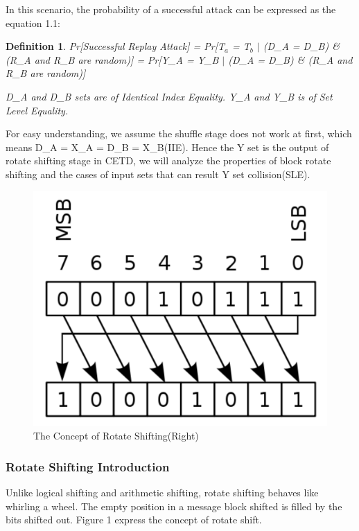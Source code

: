 \documentclass{article}
\newtheorem{defination}{Definition}[section]
\begin{document}
In this scenario, the probability of a successful attack can be expressed as the equation 1.1:
\begin{defination}
Pr[Successful Replay Attack] = Pr[T$_a$ = T$_b$ $\mid$ (D\_A = D\_B) \& (R\_A and R\_B are random)]
							 = Pr[Y\_A = Y\_B $\mid$ (D\_A = D\_B) \& (R\_A and R\_B are random)]
							 
D\_A and D\_B sets are of Identical Index Equality. Y\_A and Y\_B is of Set Level Equality.
\end{defination} 
For easy understanding, we assume the shuffle stage does not work at first, which means D\_A = X\_A = D\_B = X\_B(IIE). Hence the Y set is the output of rotate shifting stage in CETD, we will analyze the properties of block rotate shifting and the cases of input sets that can result Y set collision(SLE). 

\begin{figure}[htbp]
 \centering
 \includegraphics[scale=0.4]{./diagrams/rotate_right.pdf}
 \caption{The Concept of Rotate Shifting(Right)}
 \label{fig:1 }
\end{figure}

\subsubsection{Rotate Shifting Introduction} 
Unlike logical shifting and arithmetic shifting, rotate shifting
behaves like whirling a wheel. The empty position in a message block shifted is
filled by the bits shifted out. Figure 1 express the concept of rotate shift.
\end{document}
